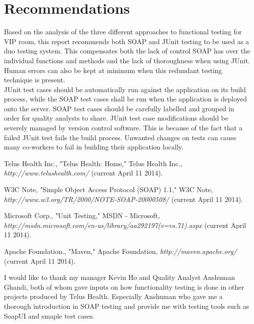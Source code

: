 \documentclass[12pt]{article}
\begin{document}
\newpage
\section{Recommendations}
Based on the analysis of the three different approaches to functional testing for VIP room, this report recommends both SOAP and JUnit testing to be used as a duo testing system. This compensates both the lack of control SOAP has over the individual functions and methods and the lack of thoroughness when using JUnit. Human errors can also be kept at minimum when this redundant testing technique is present.\\

JUnit test cases should be automatically run against the application on its build process, while the SOAP test cases shall be run when the application is deployed onto the server. SOAP test cases should be carefully labelled and grouped in order for quality analysts to share. JUnit test case modifications should be severely managed by version control software. This is because of the fact that a failed JUnit test fails the build process. Unwanted changes on tests can cause many co-workers to fail in building their application locally.\\


\newpage



\begin{thebibliography}{1}

   Telus Health Inc., "Telus Health: Home," Telus Health Inc., {\em http://www.telushealth.com/} (current April 11 2014).

   W3C Note, "Simple Object Access Protocol (SOAP) 1.1," W3C Note, {\em http://www.w3.org/TR/2000/NOTE-SOAP-20000508/} (current April 11 2014).

 Microsoft Corp., "Unit Testing," MSDN - Microsoft, {\em http://msdn.microsoft.com/en-us/library/aa292197(v=vs.71).aspx} (current April 11 2014).

 Apache Foundation., "Maven," Apache Foundation, {\em http://maven.apache.org/} (current April 11 2014).

\end{thebibliography}
\newpage


I would like to thank my manager Kevin Ho and Quality Analyst Anshuman Ghandi, both of whom gave inputs on how functionality testing is done in other projects produced by Telus Health. Especially Anshuman who gave me a thorough introduction in SOAP testing and provide me with testing tools such as SoapUI and smaple test cases.\\
\end{document}

